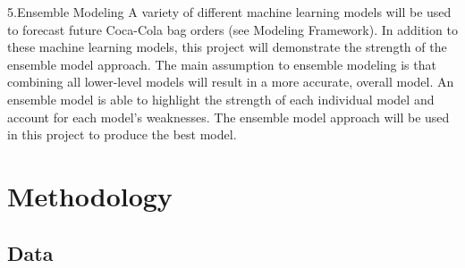 \documentclass[12pt,oneside]{chicagocapstone}
\begin{document}
5.Ensemble Modeling A variety of different machine learning models will
be used to forecast future Coca-Cola bag orders (see Modeling
Framework). In addition to these machine learning models, this project
will demonstrate the strength of the ensemble model approach. The main
assumption to ensemble modeling is that combining all lower-level models
will result in a more accurate, overall model. An ensemble model is able
to highlight the strength of each individual model and account for each
model's weaknesses. The ensemble model approach will be used in this
project to produce the best model.

\newpage

\chapter*{Methodology}\label{methodology}

\section*{Data}\label{methodology-data}
\end{document}
